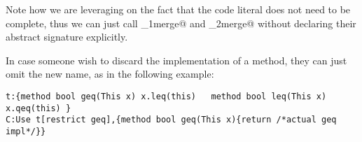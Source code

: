 Note how we are leveraging on the fact that the code literal
 does not need to be complete, 
thus we can just call \Q@_1merge@ and \Q@_2merge@ without
 declaring their abstract signature explicitly.

In case someone wish to discard the implementation of a \Q@restricted@ method,
they can just omit the new name, as in the following example:
\begin{lstlisting}
t:{method bool geq(This x) x.leq(this)   method bool leq(This x) x.qeq(this) }
C:Use t[restrict geq],{method bool geq(This x){return /*actual geq impl*/}}
\end{lstlisting}
